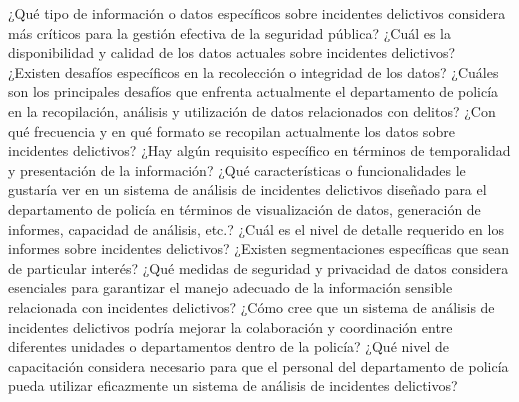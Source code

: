 ¿Qué tipo de información o datos específicos sobre incidentes delictivos considera más críticos para la gestión efectiva de la seguridad pública?
¿Cuál es la disponibilidad y calidad de los datos actuales sobre incidentes delictivos? ¿Existen desafíos específicos en la recolección o integridad de los datos?
¿Cuáles son los principales desafíos que enfrenta actualmente el departamento de policía en la recopilación, análisis y utilización de datos relacionados con delitos?
¿Con qué frecuencia y en qué formato se recopilan actualmente los datos sobre incidentes delictivos? ¿Hay algún requisito específico en términos de temporalidad y presentación de la información?
¿Qué características o funcionalidades le gustaría ver en un sistema de análisis de incidentes delictivos diseñado para el departamento de policía en términos de visualización de datos, generación de informes, capacidad de análisis, etc.?
¿Cuál es el nivel de detalle requerido en los informes sobre incidentes delictivos? ¿Existen segmentaciones específicas que sean de particular interés?
¿Qué medidas de seguridad y privacidad de datos considera esenciales para garantizar el manejo adecuado de la información sensible relacionada con incidentes delictivos?
¿Cómo cree que un sistema de análisis de incidentes delictivos podría mejorar la colaboración y coordinación entre diferentes unidades o departamentos dentro de la policía?
¿Qué nivel de capacitación considera necesario para que el personal del departamento de policía pueda utilizar eficazmente un sistema de análisis de incidentes delictivos?